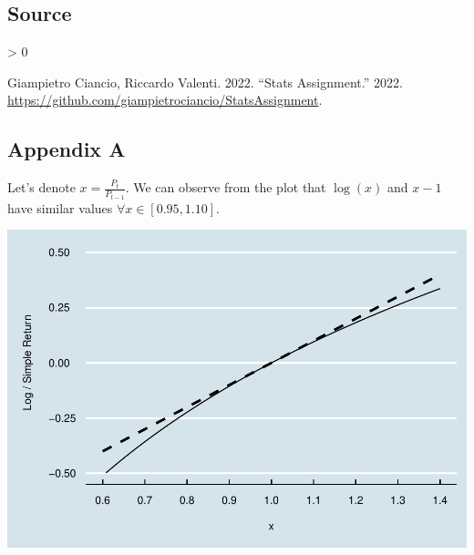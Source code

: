 \documentclass[
]{article}
\newlength{\cslhangindent}
\newenvironment{CSLReferences}[2] %
 {%
  \setlength{\parindent}{0pt}
  \ifodd #1 \everypar{\setlength{\hangindent}{\cslhangindent}}\ignorespaces\fi
  \ifnum #2 > 0
  \setlength{\parskip}{#2\baselineskip}
  \fi
 }%
 {}
\begin{document}
\hypertarget{source}{%
\subsection{Source}\label{source}}

\hypertarget{refs}{}
\begin{CSLReferences}{1}{0}
\leavevmode\hypertarget{ref-githubcodecite}{}%
Giampietro Ciancio, Riccardo Valenti. 2022. {``Stats Assignment.''}
2022. \url{https://github.com/giampietrociancio/StatsAssignment}.

\end{CSLReferences}

\hypertarget{appendix-a}{%
\subsection{Appendix A}\label{appendix-a}}

Let's denote \(x = \frac{P_t}{P_{t-1}}\). We can observe from the plot
that \(\log(x)\) and \(x-1\) have similar values
\(\forall x \in [0.95, 1.10]\).

\includegraphics[width=0.8\linewidth]{StatsAssignment_files/figure-latex/plotcurve-1}
\end{document}
